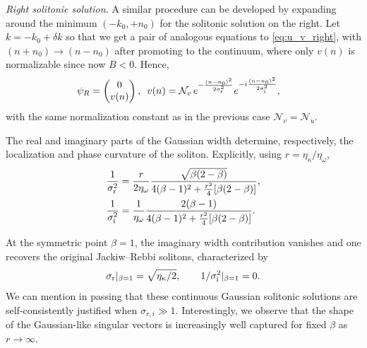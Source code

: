 \documentclass[prl,twocolumn,floatfix,10pt,superscriptaddress]{revtex4-2}
\newcommand{\mcl}[1]{\mathcal{#1}}
\begin{document}
\emph{Right solitonic solution.}
A similar procedure can be developed by expanding around the minimum $(-k_0,+n_0)$ for the solitonic solution on the right. 
Let $k=-k_0+\delta k$
so that we get a pair of analogous equations to \eqref{eq:u_v_right}, with $(n+n_0)\rightarrow (n-n_0)$ 
after promoting to the continuum, where only $v(n)$ is normalizable since now $B < 0$.
Hence,
\begin{align}
\begin{aligned}
\psi_{R}&=
\begin{pmatrix}0\\v(n)\end{pmatrix},
\,\,\,
v(n)=\mcl{N}_v\,e^{-\frac{(n-n_0)^2}{2\sigma_{\rm r}^2}}
      e^{-i\frac{(n-n_0)^2}{2\sigma_{\rm i}^2}},
\end{aligned}
\end{align}
with the same normalization constant as in the previous case $\mcl{N}_v=\mcl{N}_u$.

The real and imaginary parts of the Gaussian width determine, respectively, the localization and phase curvature of the soliton. Explicitly, using $r=\eta_\kappa/\eta_\omega$,
\begin{align}
\frac{1}{\sigma_{\rm r}^2}
&=\frac{r}{2\eta_\omega}
  \frac{\sqrt{\beta(2-\beta)}}
       {4(\beta-1)^2+\frac{r^2}{4}[\beta(2-\beta)]},\\
\frac{1}{\sigma_{\rm i}^2}
&=\frac{1}{\eta_\omega}
  \frac{2(\beta-1)}
       {4(\beta-1)^2+\frac{r^2}{4}[\beta(2-\beta)]}.
\end{align}

At the symmetric point $\beta=1$, the imaginary width contribution vanishes and one recovers the original Jackiw–Rebbi solitons, characterized by
\begin{equation}
\sigma_{\rm r}|_{\beta=1}=\sqrt{\eta_\kappa/2},\qquad
1/\sigma_{\rm i}^2|_{\beta=1}=0.
\end{equation}
We can mention in passing that these continuous Gaussian solitonic solutions are self-consistently justified when $\sigma_{r,i}\gg 1$. Interestingly, we observe that the shape of the Gaussian-like singular vectors is increasingly well captured for fixed $\beta$ as  $r\rightarrow \infty$.
\end{document}
